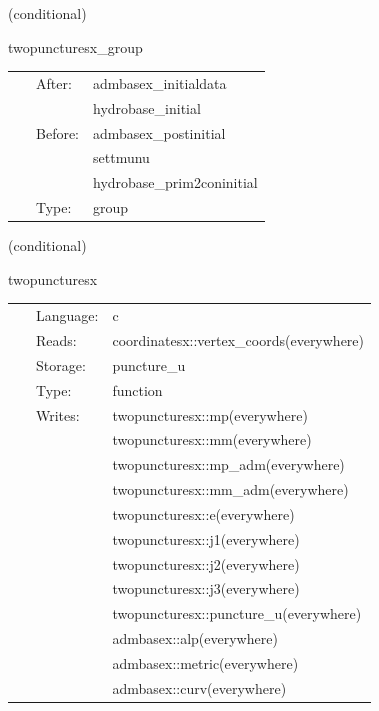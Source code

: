    (conditional) 

\hspace{5mm} twopuncturesx\_group 

\hspace{5mm}{\it twopuncturesx initial data group } 


\hspace{5mm}

 \begin{tabular*}{160mm}{cll} 
~ & After:  & admbasex\_initialdata \\ 
~& ~ &hydrobase\_initial\\ 
~ & Before:  & admbasex\_postinitial \\ 
~& ~ &settmunu\\ 
~& ~ &hydrobase\_prim2coninitial\\ 
~ & Type:  & group \\ 
\end{tabular*} 


\vspace{5mm}

   (conditional) 

\hspace{5mm} twopuncturesx 

\hspace{5mm}{\it create puncture black hole initial data } 


\hspace{5mm}

 \begin{tabular*}{160mm}{cll} 
~ & Language:  & c \\ 
~ & Reads:  & coordinatesx::vertex\_coords(everywhere) \\ 
~ & Storage:  & puncture\_u \\ 
~ & Type:  & function \\ 
~ & Writes:  & twopuncturesx::mp(everywhere) \\ 
~& ~ &twopuncturesx::mm(everywhere)\\ 
~& ~ &twopuncturesx::mp\_adm(everywhere)\\ 
~& ~ &twopuncturesx::mm\_adm(everywhere)\\ 
~& ~ &twopuncturesx::e(everywhere)\\ 
~& ~ &twopuncturesx::j1(everywhere)\\ 
~& ~ &twopuncturesx::j2(everywhere)\\ 
~& ~ &twopuncturesx::j3(everywhere)\\ 
~& ~ &twopuncturesx::puncture\_u(everywhere)\\ 
~& ~ &admbasex::alp(everywhere)\\ 
~& ~ &admbasex::metric(everywhere)\\ 
~& ~ &admbasex::curv(everywhere)\\ 
\end{tabular*} 


